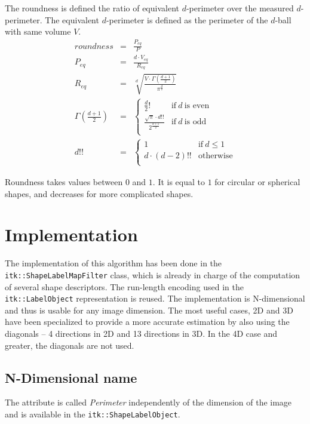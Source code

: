\documentclass{InsightArticle}
\begin{document}
The roundness is defined the ratio of equivalent $d$-perimeter over the measured $d$-perimeter. 
The equivalent $d$-perimeter is defined as the perimeter of the $d$-ball with same volume $V$.
\begin{eqnarray}
roundness             & = & \frac{P_{eq}}{P} \\
P_{eq}                & = & \frac{d \cdot V_{eq}}{R_{eq}} \\
R_{eq}                & = & \sqrt[\displaystyle d]{\frac{V\cdot\Gamma(\frac{d+1}{2})}{\pi^\frac{d}{2}}} \\
\Gamma(\frac{d+1}{2}) & = & \begin{cases}
                               \displaystyle \frac{d}{2}!  &\text{if}~ d ~\text{is even} \\
                               \displaystyle \frac{\sqrt{\pi} \cdot d!!}{2^{\frac{d+1}{2}}}  &\text{if}~ d ~\text{is odd} \\
                            \end{cases} \\
d!!                   & = & \begin{cases}
                                1 &\text{if}~ d \leq 1 \\
                                d \cdot (d-2)!!  & \text{otherwise} \\
                             \end{cases}
\end{eqnarray}


Roundness takes values between $0$ and $1$. 
It is equal to $1$ for circular or spherical shapes, 
and decreases for more complicated shapes.


\section{Implementation}

The implementation of this algorithm has been done in the \verb$itk::ShapeLabelMapFilter$ class, which is already in charge of the computation of
several shape descriptors. The run-length encoding used in the \verb$itk::LabelObject$ representation is reused.
The implementation is N-dimensional and thus is usable for any image dimension. The most useful cases, 2D and 3D have been specialized
to provide a more accurate estimation by also using the diagonals -- 4 directions in 2D and 13 directions in 3D. In the 4D case and greater,
the diagonals are not used.

\subsection{N-Dimensional name}
The attribute is called {\em Perimeter} independently of the dimension of the image and is available in the \verb$itk::ShapeLabelObject$.
\end{document}
